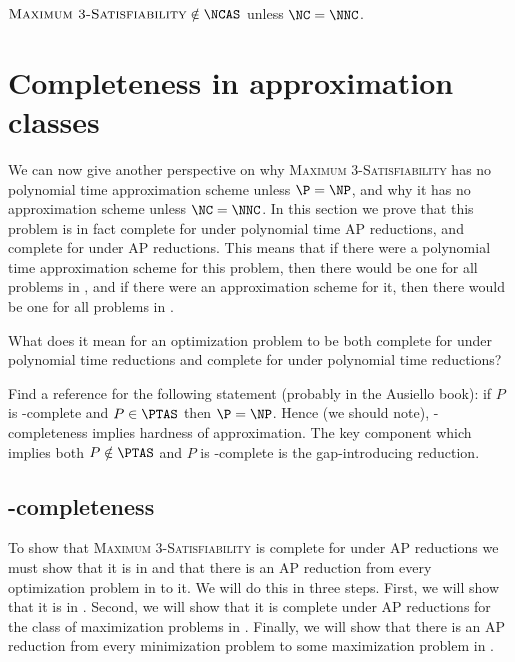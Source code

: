 \documentclass[]{article}
\begin{document}
\begin{corollary}
  $\textsc{Maximum 3-Satisfiability} \notin \NCAS$ unless $\NC = \NNC$.
\end{corollary}

\section{Completeness in approximation classes}\label{sec:complete}

We can now give another perspective on why \textsc{Maximum 3-Satisfiability} has no polynomial time approximation scheme unless $\P = \NP$, and why it has no \NC{} approximation scheme unless $\NC = \NNC$.
In this section we prove that this problem is in fact complete for \APX{} under polynomial time AP reductions, and complete for \NCX{} under \NC{} AP reductions.
This means that if there were a polynomial time approximation scheme for this problem, then there would be one for all problems in \APX, and if there were an \NC{} approximation scheme for it, then there would be one for all problems in \NCX.

\begin{todo}
  What does it mean for an optimization problem to be both complete for \APX{} under polynomial time reductions and complete for \NCX{} under polynomial time reductions?
\end{todo}

\begin{todo}
  Find a reference for the following statement (probably in the Ausiello book): if $P$ is \APX-complete and $P \in \PTAS$ then $\P = \NP$.
  Hence (we should note), \APX-completeness implies hardness of approximation.
  The key component which implies both $P \notin \PTAS$ and $P$ is \APX-complete is the gap-introducing reduction.
\end{todo}

\subsection{\texorpdfstring{\APX}{APX}-completeness}\label{ssc:apxcomplete}

To show that \textsc{Maximum 3-Satisfiability} is complete for \APX{} under AP reductions we must show that it is in \APX{} and that there is an AP reduction from every optimization problem in \APX{} to it.
We will do this in three steps.
First, we will show that it is in \APX.
Second, we will show that it is complete under AP reductions for the class of maximization problems in \APX.
Finally, we will show that there is an AP reduction from every minimization problem to some maximization problem in \APX.
\end{document}
